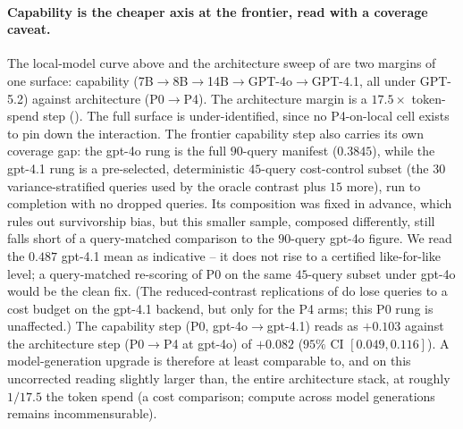 \documentclass[11pt]{article}
\begin{document}
\paragraph{Capability is the cheaper axis at the frontier, read with a coverage caveat.}
The local-model curve above and the architecture sweep of  are two
margins of one surface: capability (7B$\to$8B$\to$14B$\to$GPT-4o$\to$GPT-4.1, all under
GPT-5.2) against architecture (P0$\to$P4). The architecture margin is a $17.5\times$
token-spend step (). The full surface is under-identified, since no
P4-on-local cell exists to pin down the interaction. The frontier capability step also
carries its own coverage gap: the gpt-4o rung is the full $90$-query manifest
($0.3845$), while the gpt-4.1 rung is a pre-selected, deterministic $45$-query
cost-control subset (the $30$ variance-stratified queries used by the oracle contrast
plus $15$ more), run to completion with no dropped queries. Its composition was fixed in
advance, which rules out survivorship bias, but this smaller sample, composed differently,
still falls short of a query-matched comparison to the $90$-query gpt-4o figure. We read the
$0.487$ gpt-4.1 mean as indicative -- it does not rise to a certified like-for-like
level; a query-matched re-scoring of P0 on the same $45$-query subset under gpt-4o would
be the clean fix. (The reduced-contrast replications of
 do lose queries to a cost budget on the gpt-4.1
backend, but only for the P4 arms; this P0 rung is unaffected.) The capability step
(P0, gpt-4o$\to$gpt-4.1) reads as $+0.103$ against the
architecture step (P0$\to$P4 at gpt-4o) of $+0.082$ ($95\%$ CI $[0.049, 0.116]$). A
model-generation upgrade is therefore at least comparable to, and on this uncorrected
reading slightly larger than, the entire architecture stack, at roughly $1/17.5$ the
token spend (a cost comparison; compute across model generations remains
incommensurable).
\end{document}
